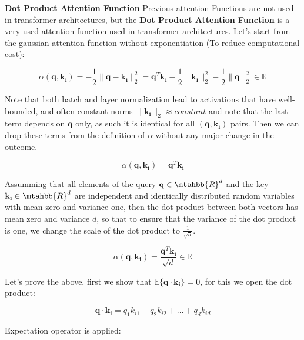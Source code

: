 \newpage

\textbf{Dot Product Attention Function}
Previous attention Functions are not used in transformer architectures, but the \textbf{Dot Product Attention Function} is a very used attention function used in transformer architectures. Let's start from the gaussian attention function without exponentiation (To reduce computational cost):

\begin{equation}
    \alpha (\mathbf{q},\mathbf{k_{i}})=-\frac{1}{2}\lVert \mathbf{q}-\mathbf{k_{i}} \rVert_2^{2}=\mathbf{q}^{T}\mathbf{k_{i}}-\frac{1}{2}\lVert \mathbf{k_{i}} \rVert_2^{2}-\frac{1}{2}\lVert \mathbf{q} \rVert_2^{2} \in \mathbb{R}
\end{equation}

Note that both batch and layer normalization  lead to activations that have well-bounded, and often constant norms $\lVert \mathbf{k_{i}} \rVert_2 \approx constant$ and note that the last term depends on $\mathbf{q}$ only, as such it is identical for all $(\mathbf{q},\mathbf{k_{i}})$ pairs. Then we can drop these terms from the definition of $\alpha$ without any major change in the outcome.

\begin{equation}
    \alpha (\mathbf{q},\mathbf{k_{i}})=\mathbf{q}^{T}\mathbf{k_{i}}
\end{equation}

Assumming that all elements of the query $\mathbf{q} \in \mtahbb{R}^{d}$ and the key $\mathbf{k_{i}} \in \mtahbb{R}^{d}$ are independent and identically distributed random variables with mean zero and variance one, then the dot product between both vectors has mean zero and variance $d$, so that to ensure that the variance of the dot product is one, we change the scale of the dot product to $\frac{1}{\sqrt{d}}$.

\begin{equation}
    \alpha (\mathbf{q},\mathbf{k_{i}})=\frac{\mathbf{q}^{T}\mathbf{k_{i}}}{\sqrt{d}} \in \mathbb{R}
\end{equation}

Let's prove the above, first we show that $\mathbb{E} \{\mathbf{q} \cdot{} \mathbf{k_i}\}=0$, for this we open the dot product:

\begin{equation}
    \mathbf{q} \cdot{} \mathbf{k_i}=q_1k_{i1}+q_2k_{i2}+...+q_dk_{id}
\end{equation}

Expectation operator is applied:

